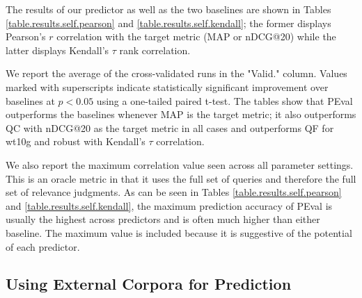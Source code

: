 \documentclass{sig-alternate}
\begin{document}
The results of our predictor as well as the two baselines are shown in Tables \ref{table.results.self.pearson} and \ref{table.results.self.kendall}; the former displays Pearson's $r$ correlation with the target metric (MAP or nDCG@20) while the latter displays Kendall's $\tau$ rank correlation.

We report the average of the cross-validated runs in the "Valid." column. Values marked with superscripts indicate statistically significant improvement over baselines at $p < 0.05$ using a one-tailed paired t-test. The tables show that PEval outperforms the baselines whenever MAP is the target metric; it also outperforms QC with nDCG@20 as the target metric in all cases and outperforms QF for wt10g and robust with Kendall's $\tau$ correlation.

We also report the maximum correlation value seen across all parameter settings. This is an oracle metric in that it uses the full set of queries and therefore the full set of relevance judgments. As can be seen in Tables \ref{table.results.self.pearson} and \ref{table.results.self.kendall}, the maximum prediction accuracy of PEval is usually the highest across predictors and is often much higher than either baseline. The maximum value is included because it is suggestive of the potential of each predictor.

\subsection{Using External Corpora for Prediction}\label{section.results.external}
\end{document}
